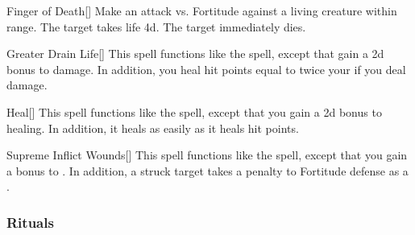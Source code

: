 \lowercase{\hypertarget{spell:Finger of Death}{}}\label{spell:Finger of Death}
\begin{apability}[\nth{5}]{\hypertarget{spell:Finger of Death}{Finger of Death}}[]
Make an attack vs. Fortitude against a living creature within \rngclose range.
\hit The target takes life  \plus4d.
\crit The target immediately dies.
\end{apability}
\vspace{0.25em}



\lowercase{\hypertarget{spell:Greater Drain Life}{}}\label{spell:Greater Drain Life}
\begin{apability}[\nth{5}]{\hypertarget{spell:Greater Drain Life}{Greater Drain Life}}[]
This spell functions like the  spell, except that gain a \plus2d bonus to damage.
In addition, you heal hit points equal to twice your  if you deal damage.
\end{apability}
\vspace{0.25em}



\lowercase{\hypertarget{spell:Heal}{}}\label{spell:Heal}
\begin{apability}[\nth{5}]{\hypertarget{spell:Heal}{Heal}}[]
This spell functions like the  spell, except that you gain a \plus2d bonus to healing.
In addition, it heals  as easily as it heals hit points.
\end{apability}
\vspace{0.25em}



\lowercase{\hypertarget{spell:Supreme Inflict Wounds}{}}\label{spell:Supreme Inflict Wounds}
\begin{apability}[\nth{5}]{\hypertarget{spell:Supreme Inflict Wounds}{Supreme Inflict Wounds}}[]
This spell functions like the  spell, except that you gain a  bonus to .
In addition, a struck target takes a  penalty to Fortitude defense as a .
\end{apability}
\vspace{0.25em}



\subsubsection{Rituals}


